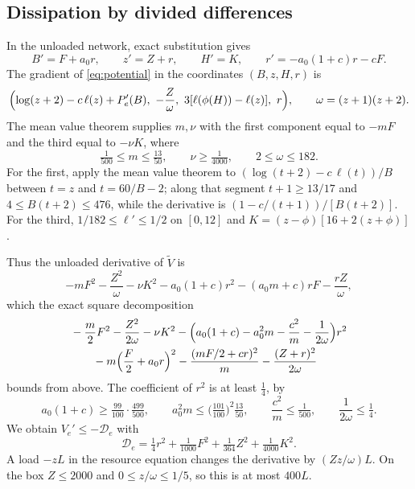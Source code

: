 \documentclass[11pt,a4paper]{article}
\theoremstyle{plain}
\theoremstyle{definition}
\theoremstyle{remark}
\newcommand{\D}{\mathcal D}
\begin{document}
\subsection{Dissipation by divided differences}
In the unloaded network, exact substitution gives
\[
B'=F+a_0r,\qquad z'=Z+r,\qquad H'=K,\qquad r'=-a_0(1+c)r-cF .
\]
The gradient of \eqref{eq:potential} in the coordinates $(B,z,H,r)$ is
\[
\Bigl(\log(z+2)-c\,\ell(z)+P_e'(B),\ -\frac Z\omega,\ 3[\ell(\phi(H))-\ell(z)],\ r\Bigr),\qquad\omega=(z+1)(z+2).
\]
The mean value theorem supplies $m,\nu$ with the first component equal to $-mF$ and the third equal to $-\nu K$, where
\[
\tfrac1{500}\le m\le\tfrac{13}{50},\qquad\nu\ge\tfrac1{4000},\qquad2\le\omega\le182 .
\]
For the first, apply the mean value theorem to $(\log(t+2)-c\,\ell(t))/B$ between $t=z$ and $t=60/B-2$; along that segment $t+1\ge13/17$ and $4\le B(t+2)\le476$, while the derivative is $(1-c/(t+1))/[B(t+2)]$. For the third, $1/182\le\ell'\le1/2$ on $[0,12]$ and $K=(z-\phi)[16+2(z+\phi)]$.

Thus the unloaded derivative of $\widetilde V$ is
\[
-mF^2-\frac{Z^2}\omega-\nu K^2-a_0(1+c)r^2-(a_0m+c)rF-\frac{rZ}\omega ,
\]
which the exact square decomposition
\begin{align*}
&-\frac m2F^2-\frac{Z^2}{2\omega}-\nu K^2
-\Bigl(a_0(1+c)-a_0^2m-\frac{c^2}m-\frac1{2\omega}\Bigr)r^2\\
&\qquad-m\Bigl(\frac F2+a_0r\Bigr)^2-\frac{(mF/2+cr)^2}m-\frac{(Z+r)^2}{2\omega}
\end{align*}
bounds from above. The coefficient of $r^2$ is at least $\tfrac14$, by
\[
a_0(1+c)\ge\tfrac{99}{100}\cdot\tfrac{499}{500},\qquad
a_0^2m\le\bigl(\tfrac{101}{100}\bigr)^2\tfrac{13}{50},\qquad
\frac{c^2}m\le\tfrac1{500},\qquad\frac1{2\omega}\le\tfrac14 .
\]
We obtain $V_e'\le-\D_e$ with
\begin{equation}\label{eq:D}
\D_e=\tfrac14r^2+\tfrac1{1000}F^2+\tfrac1{364}Z^2+\tfrac1{4000}K^2 .
\end{equation}
A load $-zL$ in the resource equation changes the derivative by $(Zz/\omega)L$. On the box $Z\le2000$ and $0\le z/\omega\le1/5$, so this is at most $400L$.
\end{document}
